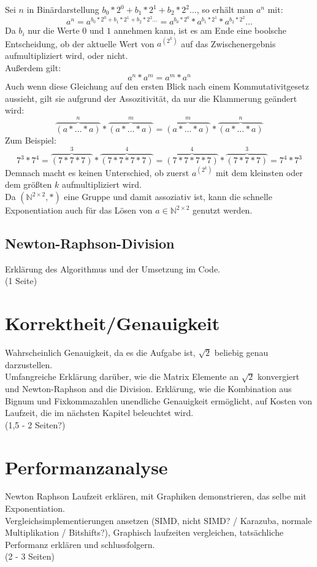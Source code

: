 \documentclass[course=erap]{aspdoc}
\begin{document}
Sei $n$ in Binärdarstellung $b_0*2^0+b_1*2^1+b_2*2^2\dots$, so erhält man $a^n$ mit:
\[ a^n = a^{b_0*2^0+b_1*2^1+b_2*2^2\dots} = a^{b_0*2^0} * a^{b_1*2^1} * a^{b_2*2^2} \dots \]
Da $b_i$ nur die Werte $0$ und $1$ annehmen kann, ist es am Ende eine boolsche Entscheidung, ob der aktuelle Wert von $a^{(2^k)}$ auf das Zwischenergebnis aufmultipliziert wird, oder nicht.\\
Außerdem gilt:
\begin{equation}\label{swap_exponents}
      a^n*a^m = a^m*a^n
\end{equation}
Auch wenn diese Gleichung auf den ersten Blick nach einem Kommutativitgesetz aussieht, gilt sie aufgrund der Assozitivität, da nur die Klammerung geändert wird:
\[ \overbrace{(a*\dots*a)}^n*\overbrace{(a*\dots*a)}^m = \overbrace{(a*\dots*a)}^m*\overbrace{(a*\dots*a)}^n \]
Zum Beispiel:
\[ 7^3*7^4 = \overbrace{(7*7*7)}^3*\overbrace{(7*7*7*7)}^4 = \overbrace{(7*7*7*7)}^4*\overbrace{(7*7*7)}^3 = 7^4*7^3 \]
Demnach macht es keinen Unterschied, ob zuerst $a^{(2^k)}$ mit dem kleinsten oder dem größten $k$ aufmultipliziert wird.\\
Da $(\mathbb{N}^{2\times 2}, *)$ eine Gruppe und damit assoziativ ist, kann die schnelle Exponentiation auch für das Lösen von $a\in\mathbb{N}^{2\times 2}$ genutzt werden.
\subsection{Newton-Raphson-Division}
Erklärung des Algorithmus und der Umsetzung im Code. \\
(1 Seite)

\section{Korrektheit/Genauigkeit}
Wahrscheinlich Genauigkeit, da es die Aufgabe ist, $\sqrt{2}$ beliebig genau darzustellen. \\

Umfangreiche Erklärung darüber, wie die Matrix Elemente an $\sqrt{2}$ konvergiert und Newton-Raphson and die Division. Erklärung, wie die Kombination aus Bignum und Fixkommazahlen unendliche Genauigkeit 
ermöglicht, auf Kosten von Laufzeit, die im nächsten Kapitel beleuchtet wird. \\ 
(1,5 - 2 Seiten?)

\section{Performanzanalyse}
Newton Raphson Laufzeit erklären, mit Graphiken demonstrieren, das selbe mit Exponentiation. \\
Vergleichsimplementierungen ansetzen (SIMD, nicht SIMD? / Karazuba, normale Multiplikation / Bitshifts?), Graphisch laufzeiten vergleichen, tatsächliche Performanz erklären und schlussfolgern. \\
(2 - 3 Seiten)
\end{document}
